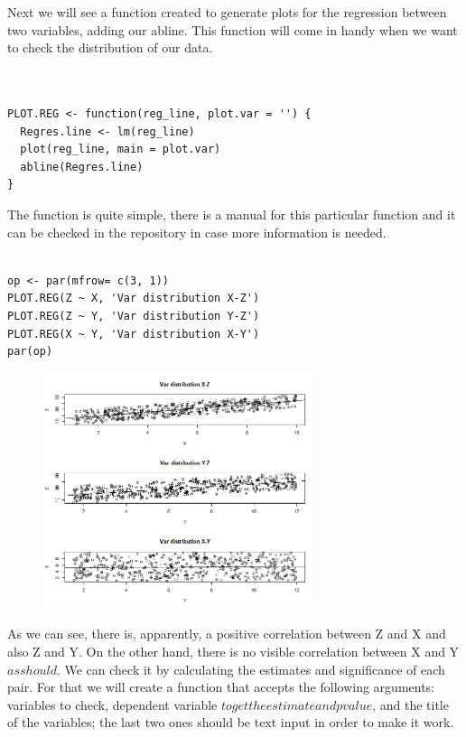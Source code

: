\documentclass{article}
\begin{document}
Next we will see a function created to generate plots for the regression between two variables, adding our abline. This function will come in handy when we want to check the distribution of our data.


\begin{lstlisting}


PLOT.REG <- function(reg_line, plot.var = '') {
  Regres.line <- lm(reg_line)
  plot(reg_line, main = plot.var)
  abline(Regres.line)
}

\end{lstlisting}

The function is quite simple, there is a manual for this particular function 
and it can be checked in the repository in case more information is needed.



\begin{lstlisting}

op <- par(mfrow= c(3, 1))
PLOT.REG(Z ~ X, 'Var distribution X-Z')
PLOT.REG(Z ~ Y, 'Var distribution Y-Z')
PLOT.REG(X ~ Y, 'Var distribution X-Y')
par(op)

\end{lstlisting}


\begin{figure}[h]
\includegraphics[width=8cm]{PLOT_CASE1.png}
\centering
\end{figure}
\newpage


As we can see, there is, apparently, a positive correlation between Z and X and also Z and Y. On the other hand, there is no visible correlation between X and Y  \( as should \). We can check it by calculating the estimates and significance of each pair. For that we will create a function that accepts the following  arguments: variables to check, dependent variable \( to get the estimate and p value \), and the title of the variables; the last two ones should be text input in order to make it work.
\end{document}
